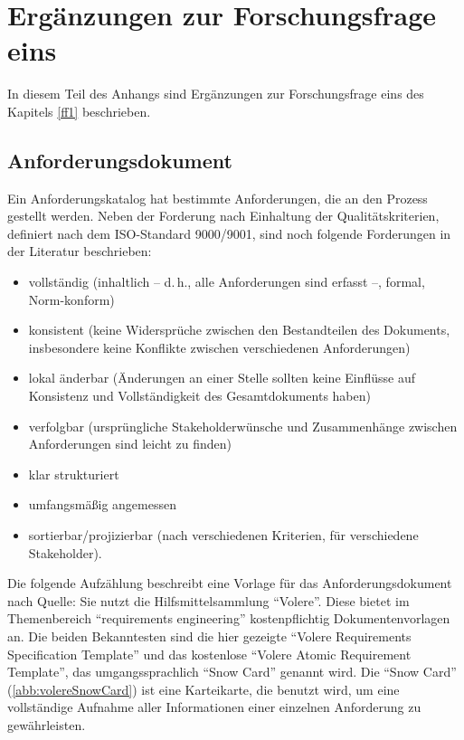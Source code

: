 \chapter{Ergänzungen zur Forschungsfrage eins} \label{appendixFF1}
In diesem Teil des Anhangs sind Ergänzungen zur Forschungsfrage eins des Kapitels \vref{ff1} beschrieben.

\section{Anforderungsdokument}\label{appendixAnforderung}

Ein Anforderungskatalog hat bestimmte Anforderungen, die an den Prozess gestellt werden. Neben der Forderung nach Einhaltung der Qualitätskriterien, definiert nach dem ISO-Standard 9000/9001, sind noch folgende Forderungen in der Literatur beschrieben: \autocite[sig.][S.\,34]{partsch_requirements-engineering_2010}

\begin{itemize}
	\item vollständig (inhaltlich – d.\,h., alle Anforderungen sind erfasst –, formal, Norm-konform)
	\item konsistent (keine Widersprüche zwischen den Bestandteilen des Dokuments,
	insbesondere keine Konflikte zwischen verschiedenen Anforderungen)
	\item lokal änderbar (Änderungen an einer Stelle sollten keine Einflüsse auf Konsistenz und Vollständigkeit des Gesamtdokuments haben)
	\item verfolgbar (ursprüngliche Stakeholderwünsche und Zusammenhänge zwischen
	Anforderungen sind leicht zu finden)
	\item klar strukturiert
	\item umfangsmäßig angemessen
	\item sortierbar/projizierbar (nach verschiedenen Kriterien, für verschiedene Stakeholder).
\end{itemize}

Die folgende Aufzählung beschreibt eine Vorlage für das Anforderungsdokument nach Quelle: Sie nutzt die Hilfsmittelsammlung \enquote{Volere}. Diese bietet im Themenbereich \enquote{requirements engineering} kostenpflichtig Dokumentenvorlagen an. Die beiden Bekanntesten sind die hier gezeigte \enquote{Volere Requirements Specification Template} und das kostenlose \enquote{Volere Atomic Requirement Template}, das umgangssprachlich \enquote{Snow Card} genannt wird. Die \enquote{Snow Card} (\vref{abb:volereSnowCard}) ist eine Karteikarte, die benutzt wird, um eine vollständige Aufnahme aller Informationen einer einzelnen Anforderung zu gewährleisten.\autocite[vgl.][]{VolereSnowCard} 

